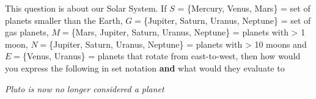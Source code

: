 

\question This question is about our Solar System. If $S$ = \{Mercury, Venus, Mars\} = 
set of planets smaller than the Earth, $G =$\{Jupiter, Saturn, Uranus, Neptune\} = set of gas planets,
$M=$\{Mars, Jupiter, Saturn, Uranus, Neptune\} = planets with > 1 moon, $N=$\{Jupiter, Saturn, Uranus, Neptune\} 
= planets with > 10 moons and $E=$\{Venus, Uranus\} = planets that rotate from east-to-west, then how 
would you express the following in set notation \textbf{and} what would they evaluate to

\textit{Pluto is now no longer considered a planet}

\insertQR{}

